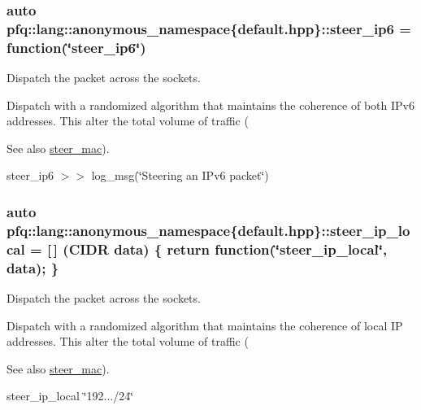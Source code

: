 \subsubsection[{\texorpdfstring{steer\+\_\+ip6}{steer_ip6}}]{\setlength{\rightskip}{0pt plus 5cm}auto pfq\+::lang\+::anonymous\+\_\+namespace\{default.\+hpp\}\+::steer\+\_\+ip6 = {\bf function}(\char`\"{}steer\+\_\+ip6\char`\"{})}\hypertarget{namespacepfq_1_1lang_1_1anonymous__namespace_02default_8hpp_03_a02291b124a4aa900d78797e386517f69}{}\label{namespacepfq_1_1lang_1_1anonymous__namespace_02default_8hpp_03_a02291b124a4aa900d78797e386517f69}


Dispatch the packet across the sockets. 

Dispatch with a randomized algorithm that maintains the coherence of both I\+Pv6 addresses. This alter the total volume of traffic (\begin{DoxySeeAlso}{See also}
\hyperlink{namespacepfq_1_1lang_1_1anonymous__namespace_02default_8hpp_03_ad51e91e3b485c729ac1ba39a46e337a0}{steer\+\_\+mac}).
\end{DoxySeeAlso}
steer\+\_\+ip6 $>$$>$ log\+\_\+msg(\char`\"{}\+Steering an I\+Pv6 packet\char`\"{}) 
\subsubsection[{\texorpdfstring{steer\+\_\+ip\+\_\+local}{steer_ip_local}}]{\setlength{\rightskip}{0pt plus 5cm}auto pfq\+::lang\+::anonymous\+\_\+namespace\{default.\+hpp\}\+::steer\+\_\+ip\+\_\+local = \mbox{[}$\,$\mbox{]} ({\bf C\+I\+DR} data) \{ return {\bf function}(\char`\"{}steer\+\_\+ip\+\_\+local\char`\"{}, data); \}}\hypertarget{namespacepfq_1_1lang_1_1anonymous__namespace_02default_8hpp_03_a573c7621db324727daedc11fd27ab709}{}\label{namespacepfq_1_1lang_1_1anonymous__namespace_02default_8hpp_03_a573c7621db324727daedc11fd27ab709}


Dispatch the packet across the sockets. 

Dispatch with a randomized algorithm that maintains the coherence of local IP addresses. This alter the total volume of traffic (\begin{DoxySeeAlso}{See also}
\hyperlink{namespacepfq_1_1lang_1_1anonymous__namespace_02default_8hpp_03_ad51e91e3b485c729ac1ba39a46e337a0}{steer\+\_\+mac}).
\end{DoxySeeAlso}
steer\+\_\+ip\+\_\+local \char`\"{}192.../24\char`\"{} 
